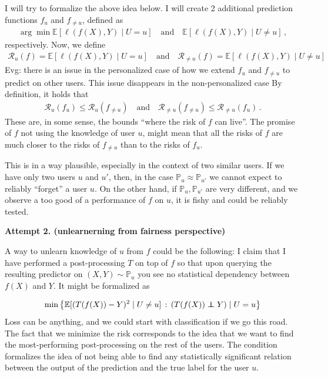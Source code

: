 I will try to formalize the above idea below. I will create 2 additional prediction functions $f_{u}$ and $f_{\neq u}$, defined as
\begin{align*}
    \arg\min \mathbb{E}[\ell(f(X), Y) \mid U = u] \quad\text{and}\quad \mathbb{E}[\ell(f(X), Y) \mid U \neq u]\,,
\end{align*}
respectively. Now, we define
\begin{align*}
    \mathcal{R}_u(f) = \mathbb{E}[\ell(f(X), Y) \mid U = u]\quad\text{and}\quad\mathcal{R}_{\neq u}(f) = \mathbb{E}[\ell(f(X), Y) \mid U \neq u]
\end{align*}
{\color{red}Evg: there is an issue in the personalized case of how we extend $f_u$ and $f_{\neq u}$ to predict on other users. This issue disappears in the non-personalized case}
By definition, it holds that
\begin{align*}
    \mathcal{R}_u(f_u) \leq \mathcal{R}_u(f_{\neq u})\quad\text{and}\quad \mathcal{R}_{\neq u}(f_{\neq u}) \leq \mathcal{R}_{\neq u}(f_u)\,.
\end{align*}
These are, in some sense, the bounds ``where the risk of $f$ can live''. The promise of $f$ not using the knowledge of user $u$, might mean that all the risks of $f$ are much closer to the risks of $f_{\neq u}$ than to the risks of $f_{u}$.

This is in a way plausible, especially in the context of two similar users. If we have only two users $u$ and $u'$, then, in the case $\mathbb{P}_u \approx \mathbb{P}_{u'}$ we cannot expect to reliably ``forget'' a user $u$. On the other hand, if $\mathbb{P}_u, \mathbb{P}_{u'}$ are very different, and we observe a too good of a performance of $f$ on $u$, it is fishy and could be reliably tested.


\textbf{Attempt 2. (unlearnerning from fairness perspective)}

A way to unlearn knowledge of $u$ from $f$ could be the following: I claim that I have performed a post-processing $T$ on top of $f$ so that upon querying the resulting predictor on $(X, Y) \sim \mathbb{P}_u$ you see no statistical dependency between $f(X)$ and $Y$. It might be formalized as

\begin{align*}
    \min \left\{\mathbb{E}[(T(f(X)) - Y)^2 \mid U \neq u] \,:\, (T(f(X)) \indep Y) \mid U = u\right\}
\end{align*}
Loss can be anything, and we could start with classification if we go this road. The fact that we minimize the risk corresponds to the idea that we want to find the most-performing post-processing on the rest of the users. The condition formalizes the idea of not being able to find any statistically significant relation between the output of the prediction and the true label for the user $u$.

